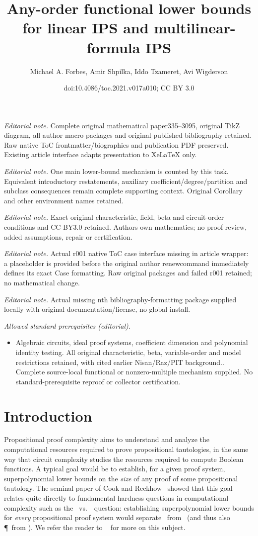 \documentclass[11pt]{article}
\title{Any-order functional lower bounds for linear IPS and multilinear-formula IPS}
\author{Michael A. Forbes, Amir Shpilka, Iddo Tzameret, Avi Wigderson}
\date{doi:10.4086/toc.2021.v017a010; CC BY 3.0}
\numberwithin{equation}{section}
\theoremstyle{definition}
\theoremstyle{plain}
\begin{document}
\maketitle
\noindent\textit{Editorial note.} Complete original mathematical paper335--3095, original TikZ diagram, all author macro packages and original published bibliography retained. Raw native ToC frontmatter/biographies and publication PDF preserved. Existing article interface adapts presentation to XeLaTeX only.\par\medskip
\noindent\textit{Editorial note.} One main lower-bound mechanism is counted by this task. Equivalent introductory restatements, auxiliary coefficient/degree/partition and subclass consequences remain complete supporting context. Original Corollary and other environment names retained.\par\medskip
\noindent\textit{Editorial note.} Exact original characteristic, field, beta and circuit-order conditions and CC BY3.0 retained. Authors own mathematics; no proof review, added assumptions, repair or certification.\par\medskip
\noindent\textit{Editorial note.} Actual r001 native ToC case interface missing in article wrapper: a placeholder is provided before the original author renewcommand immediately defines its exact Case formatting. Raw original packages and failed r001 retained; no mathematical change.\par\medskip
\noindent\textit{Editorial note.} Actual missing nth bibliography-formatting package supplied locally with original documentation/license, no global install.\par\medskip
\noindent\textit{Allowed standard prerequisites (editorial).}\begin{itemize}
\item Algebraic circuits, ideal proof systems, coefficient dimension and polynomial identity testing. All original characteristic, beta, variable-order and model restrictions retained, with cited earlier Nisan/Raz/PIT background.. Complete source-local functional or nonzero-multiple mechanism supplied. No standard-prerequisite reproof or collector certification.
\end{itemize}\medskip
\section{Introduction}

Propositional proof complexity aims to understand and analyze the computational resources required to prove propositional tautologies, in the same way that circuit complexity studies the resources required to compute Boolean functions. A typical goal would be to establish, for a given proof system, superpolynomial lower bounds on the \emph{size} of any proof of some propositional tautology. The seminal paper
of Cook and Reckhow~\cite{CookReckhow79} showed that this goal relates quite directly to fundamental hardness questions in computational complexity such as the \NP\ vs.~\coNP\ question: establishing superpolynomial lower bounds for \emph{every} propositional proof system would separate \NP\ from \coNP\ (and thus also \P\ from \NP). We refer the reader to \Krajicek~\cite{Krajicek95} for more on this subject. %
\end{document}
